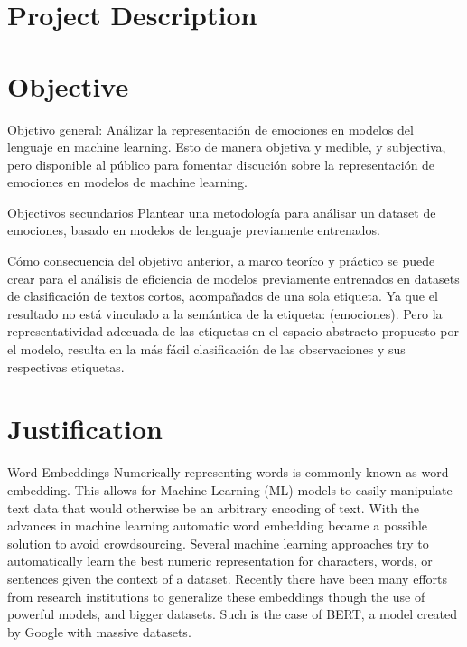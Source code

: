 \section{Project Description}\label{sec:Project Description}


\section{Objective}\label{sec:Objective}

Objetivo general:
Análizar la representación de emociones en modelos del lenguaje en machine learning. Esto de manera objetiva y medible, y subjectiva, pero disponible al público para fomentar discución sobre la representación de emociones en modelos de machine learning.

Objectivos secundarios
Plantear una metodología para análisar un dataset de emociones, basado en modelos de lenguaje previamente entrenados.

Cómo consecuencia del objetivo anterior, a marco teoríco y práctico se puede crear para el análisis de eficiencia de modelos previamente entrenados en datasets de clasificación de textos cortos, acompañados de una sola etiqueta. Ya que el resultado no está vinculado a la semántica de la etiqueta: (emociones). Pero la representatividad adecuada de las etiquetas en el espacio abstracto propuesto por el modelo, resulta en la más fácil clasificación de las observaciones y sus respectivas etiquetas.

\section{Justification}\label{sec:Justification}

Word Embeddings
Numerically representing words is commonly known as word embedding. This allows for Machine Learning (ML) models to easily manipulate text data that would otherwise be an arbitrary encoding of text. With the advances in machine learning automatic word embedding became a possible solution to avoid crowdsourcing. %
Several machine learning approaches try to automatically learn the best numeric representation for characters, words, or sentences given the context of a dataset. Recently there have been many efforts from research institutions to generalize these embeddings though the use of powerful models, and bigger datasets. Such is the case of BERT, a model created by Google with massive datasets.

